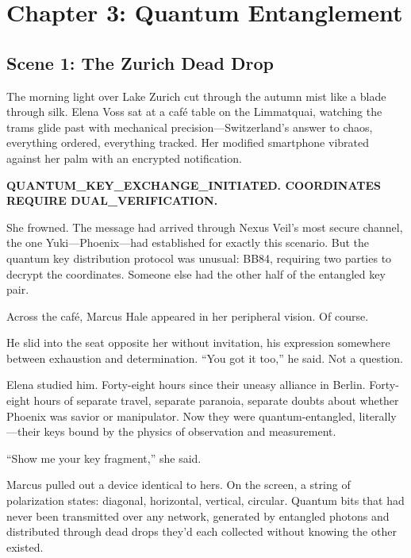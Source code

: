 \hypertarget{chapter-3-quantum-entanglement}{%
\section{Chapter 3: Quantum
Entanglement}\label{chapter-3-quantum-entanglement}}

\hypertarget{scene-1-the-zurich-dead-drop}{%
\subsection{Scene 1: The Zurich Dead
Drop}\label{scene-1-the-zurich-dead-drop}}

The morning light over Lake Zurich cut through the autumn mist like a
blade through silk. Elena Voss sat at a café table on the Limmatquai,
watching the trams glide past with mechanical precision---Switzerland's
answer to chaos, everything ordered, everything tracked. Her modified
smartphone vibrated against her palm with an encrypted notification.

\textbf{QUANTUM\_KEY\_EXCHANGE\_INITIATED. COORDINATES REQUIRE
DUAL\_VERIFICATION.}

She frowned. The message had arrived through Nexus Veil's most secure
channel, the one Yuki---Phoenix---had established for exactly this
scenario. But the quantum key distribution protocol was unusual: BB84,
requiring two parties to decrypt the coordinates. Someone else had the
other half of the entangled key pair.

Across the café, Marcus Hale appeared in her peripheral vision. Of
course.

He slid into the seat opposite her without invitation, his expression
somewhere between exhaustion and determination. ``You got it too,'' he
said. Not a question.

Elena studied him. Forty-eight hours since their uneasy alliance in
Berlin. Forty-eight hours of separate travel, separate paranoia,
separate doubts about whether Phoenix was savior or manipulator. Now
they were quantum-entangled, literally---their keys bound by the physics
of observation and measurement.

``Show me your key fragment,'' she said.

Marcus pulled out a device identical to hers. On the screen, a string of
polarization states: diagonal, horizontal, vertical, circular. Quantum
bits that had never been transmitted over any network, generated by
entangled photons and distributed through dead drops they'd each
collected without knowing the other existed.

